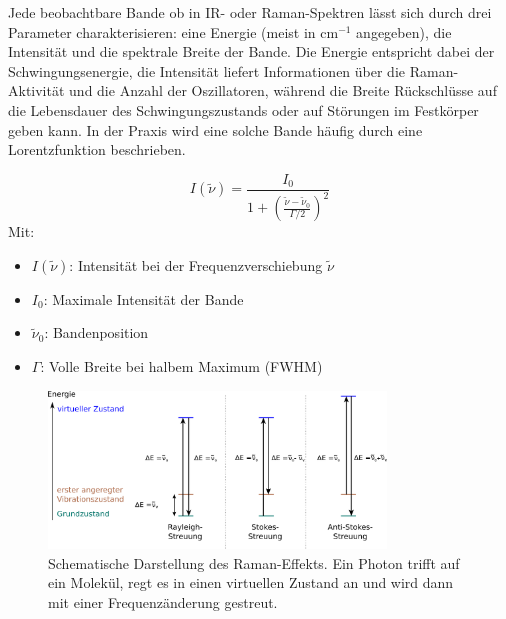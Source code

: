 Jede beobachtbare Bande ob in IR- oder Raman-Spektren lässt sich durch drei Parameter charakterisieren: eine Energie (meist in cm$^{-1}$ angegeben), 
die Intensität und die spektrale Breite der Bande. Die Energie entspricht dabei der Schwingungsenergie, die Intensität liefert Informationen über die Raman-Aktivität und die Anzahl der Oszillatoren, 
während die Breite Rückschlüsse auf die Lebensdauer des Schwingungszustands oder auf Störungen im Festkörper geben kann. In der Praxis wird eine solche Bande häufig durch eine Lorentzfunktion beschrieben.

\begin{equation}
    I(\tilde{\nu}) = \frac{I_0}{1 + \left(\frac{\tilde{\nu} - \tilde{\nu}_0}{\Gamma/2}\right)^2}
\end{equation}
Mit:
\begin{itemize}
    \item $I(\tilde{\nu})$: Intensität bei der Frequenzverschiebung $\tilde{\nu}$
    \item $I_0$: Maximale Intensität der Bande
    \item $\tilde{\nu}_0$: Bandenposition
    \item $\Gamma$: Volle Breite bei halbem Maximum (FWHM)
\end{itemize}

\begin{figure}[H]
    \centering
    \includegraphics[width=0.8\textwidth]{1_Skript/Inkscape/Raman.png}
    \caption{Schematische Darstellung des Raman-Effekts. Ein Photon trifft auf ein Molekül, regt es in einen virtuellen Zustand an und wird dann mit einer Frequenzänderung gestreut.}
    \label{fig:Raman}
\end{figure}

